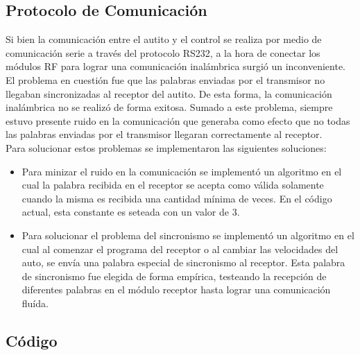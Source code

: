 \documentclass[a4paper,10pt]{article}
\begin{document}
		\subsection{Protocolo de Comunicación}
			Si bien la comunicación entre el autito y el control se realiza por medio de comunicación serie a través del protocolo RS232, a la hora de conectar
			los módulos RF para lograr una comunicación inalámbrica surgió un inconveniente. El problema en cuestión fue que las palabras enviadas por el 
			transmisor no llegaban sincronizadas al receptor del autito. De esta forma, la comunicación inalámbrica no se realizó de forma exitosa. Sumado a este 
			problema, siempre estuvo presente ruido en la comunicación que generaba como efecto que no todas las palabras enviadas por el transmisor llegaran 
			correctamente al receptor.\\
			\indent Para solucionar estos problemas se implementaron las siguientes soluciones:
			\begin{itemize}
				\item Para minizar el ruido en la comunicación se implementó un algoritmo en el cual la palabra recibida en el receptor se acepta como válida
				solamente cuando la misma es recibida una cantidad mínima de veces. En el código actual, esta constante es seteada con un valor de 3.
				\item Para solucionar el problema del sincronismo se implementó un algoritmo en el cual al comenzar el programa del receptor o al cambiar las
				velocidades del auto, se envía una palabra especial de sincronismo al receptor. Esta palabra de sincronismo fue elegida de forma empírica, testeando 
				la recepción de diferentes palabras en el módulo receptor hasta lograr una comunicación fluída.  
			\end{itemize}

	

		\subsection{Código}
\end{document}
